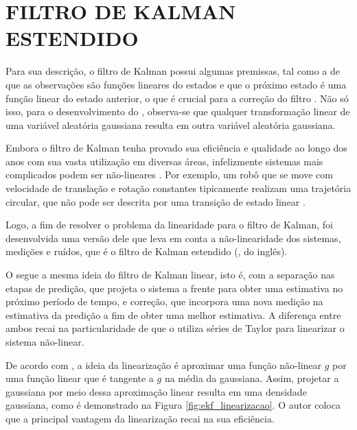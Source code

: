 \documentclass[acronym, symbols, table, deposito]{fei}
\begin{document}
		\section{FILTRO DE KALMAN ESTENDIDO}
			
			Para sua descrição, o filtro de Kalman possui algumas premissas, tal como a de que as observações são funções lineares do estados e que o próximo estado é uma função linear do estado anterior, o que é crucial para a correção do filtro \cite{thrun2002probabilistic}. Não só isso, para o desenvolvimento do , observa-se que qualquer transformação linear de uma variável aleatória gaussiana resulta em outra variável aleatória gaussiana. 
			
			Embora o filtro de Kalman tenha provado sua eficiência e qualidade ao longo dos anos com sua vasta utilização em diversas áreas, infelizmente sistemas mais complicados podem ser não-lineares \cite{khodarahmi2023review}. Por exemplo, um robô que se move com velocidade de translação e rotação constantes tipicamente realizam uma trajetória circular, que não pode ser descrita por uma transição de estado linear \cite{thrun2002probabilistic}.
			
			Logo, a fim de resolver o problema da linearidade para o filtro de Kalman, foi desenvolvida uma versão dele que leva em conta a não-linearidade dos sistemas, medições e ruídos, que é o filtro de Kalman estendido (, do inglês).
			
			O  segue a mesma ideia do filtro de Kalman linear, isto é, com a separação nas etapas de predição, que projeta o sistema a frente para obter uma estimativa no próximo período de tempo, e correção, que incorpora uma nova medição na estimativa da predição a fim de obter uma melhor estimativa. A diferença entre ambos recai na particularidade de que o  utiliza séries de Taylor para linearizar o sistema não-linear.
			
			De acordo com \textcite{thrun2002probabilistic}, a ideia da linearização é aproximar uma função não-linear $g$ por uma função linear que é tangente a $g$ na média da gaussiana. Assim, projetar a gaussiana por meio dessa aproximação linear resulta em uma densidade gaussiana, como é demonstrado na Figura \ref{fig:ekf_linearizacao}. O autor coloca que a principal vantagem da linearização recai na sua eficiência.
			
\end{document}
